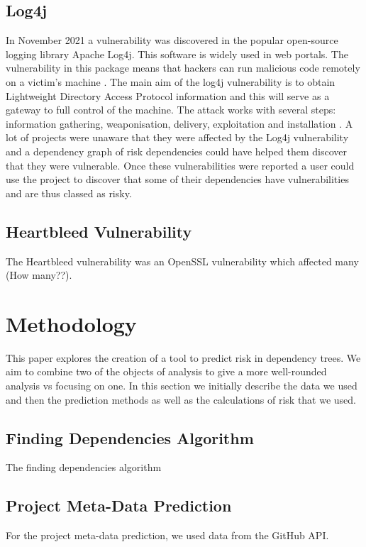 \documentclass[10pt, compsoc, conference]{IEEEtran}
\begin{document}
\subsection{Log4j}
In November 2021 a vulnerability was discovered in the popular open-source logging library Apache Log4j. This software is widely used in web portals. The vulnerability in this package means that hackers can run malicious code remotely on a victim's machine \cite{h_gupta_identification_2022}. The main aim of the log4j vulnerability is to obtain Lightweight Directory Access Protocol information and this will serve as a gateway to full control of the machine. The attack works with several steps: information gathering, weaponisation, delivery, exploitation and installation \cite{f_maulana_unmasking_2023}. A lot of projects were unaware that they were affected by the Log4j vulnerability and a dependency graph of risk dependencies could have helped them discover that they were vulnerable. Once these vulnerabilities were reported a user could use the project to discover that some of their dependencies have vulnerabilities and are thus classed as risky. 

\subsection{Heartbleed Vulnerability}
The Heartbleed vulnerability was an OpenSSL vulnerability which affected many (How many??). 

\section{Methodology}
This paper explores the creation of a tool to predict risk in dependency trees. We aim to combine two of the objects of analysis to give a more well-rounded analysis vs focusing on one. In this section we initially describe the data we used and then the prediction methods as well as the calculations of risk that we used. 

\subsection{Finding Dependencies Algorithm}
The finding dependencies algorithm 

\subsection{Project Meta-Data Prediction}
For the project meta-data prediction, we used data from the GitHub API. 
\end{document}
